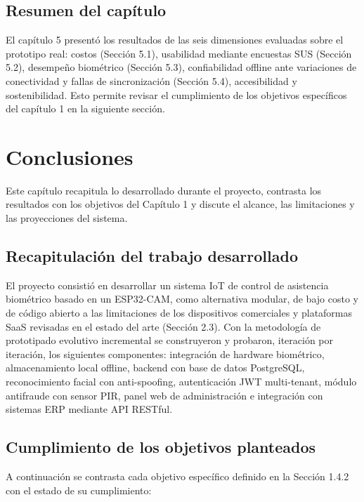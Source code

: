 \documentclass{iccmemoria}
\begin{document}
\section{Resumen del capítulo}
El capítulo 5 presentó los resultados de las seis dimensiones evaluadas sobre el prototipo real: costos (Sección 5.1), usabilidad mediante encuestas SUS (Sección 5.2), desempeño biométrico (Sección 5.3), confiabilidad offline ante variaciones de conectividad y fallas de sincronización (Sección 5.4), accesibilidad y sostenibilidad. Esto permite revisar el cumplimiento de los objetivos específicos del capítulo 1 en la siguiente sección.


\chapter{Conclusiones}
Este capítulo recapitula lo desarrollado durante el proyecto, contrasta los resultados con los objetivos del Capítulo 1 y discute el alcance, las limitaciones y las proyecciones del sistema.

\section{Recapitulación del trabajo desarrollado}
El proyecto consistió en desarrollar un sistema IoT de control de asistencia biométrico basado en un ESP32-CAM, como alternativa modular, de bajo costo y de código abierto a las limitaciones de los dispositivos comerciales y plataformas SaaS revisadas en el estado del arte (Sección 2.3). Con la metodología de prototipado evolutivo incremental se construyeron y probaron, iteración por iteración, los siguientes componentes: integración de hardware biométrico, almacenamiento local offline, backend con base de datos PostgreSQL, reconocimiento facial con anti-spoofing, autenticación JWT multi-tenant, módulo antifraude con sensor PIR, panel web de administración e integración con sistemas ERP mediante API RESTful.

\section{Cumplimiento de los objetivos planteados}
A continuación se contrasta cada objetivo específico definido en la Sección 1.4.2 con el estado de su cumplimiento:
\end{document}
